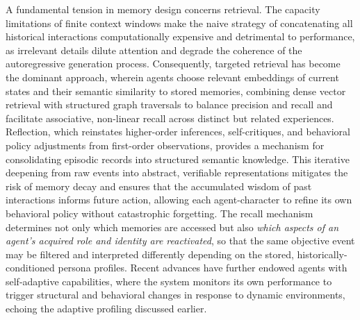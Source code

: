 \documentclass[11pt,a4paper]{article}
\begin{document}
A fundamental tension in memory design concerns retrieval. The capacity limitations of finite context windows make the naive strategy of concatenating all historical interactions computationally expensive and detrimental to performance, as irrelevant details dilute attention and degrade the coherence of the autoregressive generation process. Consequently, targeted retrieval has become the dominant approach, wherein agents choose relevant embeddings of current states and their semantic similarity to stored memories, combining dense vector retrieval with structured graph traversals to balance precision and recall and facilitate associative, non-linear recall across distinct but related experiences. Reflection, which reinstates higher-order inferences, self-critiques, and behavioral policy adjustments from first-order observations, provides a mechanism for consolidating episodic records into structured semantic knowledge. This iterative deepening from raw events into abstract, verifiable representations mitigates the risk of memory decay and ensures that the accumulated wisdom of past interactions informs future action, allowing each agent-character to refine its own behavioral policy without catastrophic forgetting. The recall mechanism determines not only which memories are accessed but also \emph{which aspects of an agent's acquired role and identity are reactivated}, so that the same objective event may be filtered and interpreted differently depending on the stored, historically-conditioned persona profiles. Recent advances have further endowed agents with self-adaptive capabilities, where the system monitors its own performance to trigger structural and behavioral changes in response to dynamic environments, echoing the adaptive profiling discussed earlier.
\end{document}
